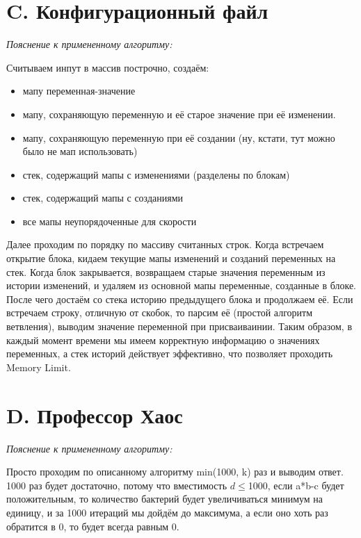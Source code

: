 \section{C. Конфигурационный файл}
\textit{Пояснение к примененному алгоритму:} \par
Считываем инпут в массив построчно, создаём:
\begin{itemize}
    \item мапу переменная-значение
    \item мапу, сохраняющую переменную и её старое значение при её изменении.
    \item мапу, сохраняющую переменную при её создании (ну, кстати, тут можно было не мап использовать)
    \item стек, содержащий мапы с изменениями (разделены по блокам)
    \item стек, содержащий мапы с созданиями
    \item все мапы неупорядоченные для скорости
\end{itemize}
Далее проходим по порядку по массиву считанных строк. Когда встречаем открытие блока, кидаем текущие мапы изменений и созданий переменных на стек. Когда блок закрывается, возвращаем старые значения переменным из истории изменений, и удаляем из основной мапы переменные, созданные в блоке. После чего достаём со стека историю предыдущего блока и продолжаем её.
Если встречаем строку, отличную от скобок, то парсим её (простой алгоритм ветвления), выводим значение переменной при присваиваинии.
Таким образом, в каждый момент времени мы имеем корректную информацию о значениях переменных, а стек историй действует эффективно, что позволяет проходить Memory Limit.
\BgThispage
\newpage

\section{D. Профессор Хаос}
\textit{Пояснение к примененному алгоритму:} \par
Просто проходим по описанному алгоритму min(1000, k) раз и выводим ответ.
1000 раз будет достаточно, потому что вместимость $d \leqslant $1000, если a*b-c будет положительным,
то количество бактерий будет увеличиваться минимум на единицу, и за 1000 итераций мы дойдём до максимума,
а если оно хоть раз обратится в 0, то будет всегда равным 0.
\BgThispage
